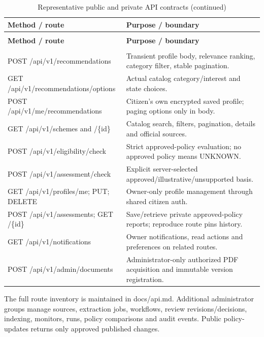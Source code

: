 \documentclass[12pt,a4paper,twoside]{report}
\begin{document}
\begingroup\small\renewcommand{\arraystretch}{1.18}
\begin{longtable}{|>{\RaggedRight\arraybackslash}p{}|>{\RaggedRight\arraybackslash}p{}|}
\caption{Representative public and private API contracts}\label{tab:representative-public-and-private-api-contracts}\\
\hline\rowcolor{sglight}\textbf{Method / route} & \textbf{Purpose / boundary} \\ \hline
\endfirsthead
\caption[]{Representative public and private API contracts (continued)}\\
\hline\rowcolor{sglight}\textbf{Method / route} & \textbf{Purpose / boundary} \\ \hline
\endhead
\hline\multicolumn{2}{r}{Continued on next page}\\\endfoot
\hline\endlastfoot
POST /api/v1/recommendations & Transient profile body, relevance ranking, category filter, stable pagination. \\ \hline
GET /api/v1/recommendations/options & Actual catalog category/interest and state choices. \\ \hline
POST /api/v1/me/recommendations & Citizen's own encrypted saved profile; paging options only in body. \\ \hline
GET /api/v1/schemes and /\{id\} & Catalog search, filters, pagination, details and official sources. \\ \hline
POST /api/v1/eligibility/check & Strict approved-policy evaluation; no approved policy means UNKNOWN. \\ \hline
POST /api/v1/assessment/check & Explicit server-selected approved/illustrative/unsupported basis. \\ \hline
GET /api/v1/profiles/me; PUT; DELETE & Owner-only profile management through shared citizen auth. \\ \hline
POST /api/v1/assessments; GET /\{id\} & Save/retrieve private approved-policy reports; reproduce route pins history. \\ \hline
GET /api/v1/notifications & Owner notifications, read actions and preferences on related routes. \\ \hline
POST /api/v1/admin/documents & Administrator-only authorized PDF acquisition and immutable version registration. \\ \hline
\end{longtable}
\endgroup\vspace{0.3em}

The full route inventory is maintained in docs/api.md. Additional administrator groups manage sources, extraction jobs, workflows, review revisions/decisions, indexing, monitors, runs, policy comparisons and audit events. Public policy-updates returns only approved published changes.
\end{document}
